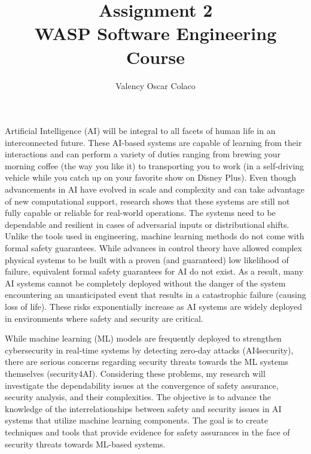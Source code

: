 \documentclass[11pt]{article}
\begin{document}
 
\title{\textbf{Assignment 2}\\WASP Software Engineering Course}
\author{Valency Oscar Colaco}
\maketitle
\par{Artificial Intelligence (AI) will be integral to all facets of human life in an interconnected future. These AI-based systems are capable of learning from their interactions and can perform a variety of duties ranging from brewing your morning coffee (the way you like it) to transporting you to work (in a self-driving vehicle while you catch up on your favorite show on Disney Plus). Even though advancements in AI have evolved in scale and complexity and can take advantage of new computational support, research shows that these systems are still not fully capable or reliable for real-world operations. The systems need to be dependable and resilient in cases of adversarial inputs or distributional shifts. Unlike the tools used in engineering, machine learning methods do not come with formal safety guarantees. While advances in control theory have allowed complex physical systems to be built with a proven (and guaranteed) low likelihood of failure, equivalent formal safety guarantees for AI do not exist. As a result, many AI systems cannot be completely deployed without the danger of the system encountering an unanticipated event that results in a catastrophic failure (causing loss of life). These risks exponentially increase as AI systems are widely deployed in environments where safety and security are critical.}
\\
\par{While machine learning (ML) models are frequently deployed to strengthen cybersecurity in real-time systems by detecting zero-day attacks (AI4security), there are serious concerns regarding security threats towards the ML systems themselves (security4AI). Considering these problems, my research will investigate the dependability issues at the convergence of safety assurance, security analysis, and their complexities. The objective is to advance the knowledge of the interrelationships between safety and security issues in AI systems that utilize machine learning components. The goal is to create techniques and tools that provide evidence for safety assurances in the face of security threats towards ML-based systems.}
\\
\end{document}
